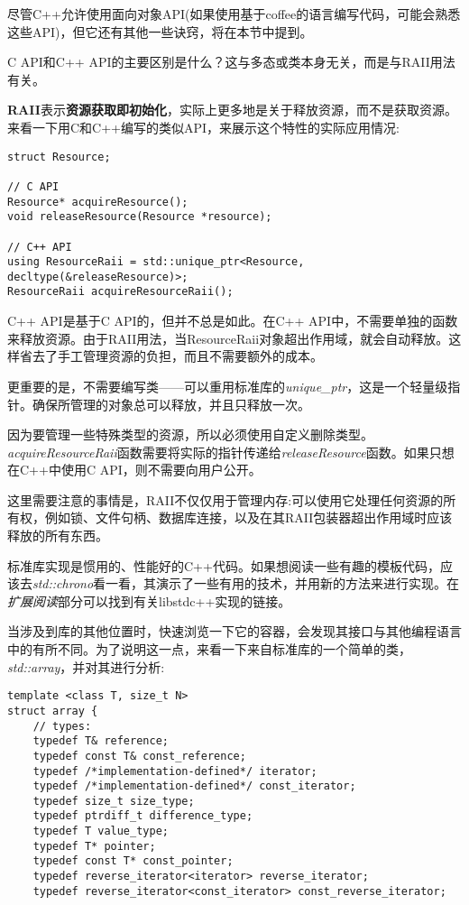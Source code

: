 
尽管C++允许使用面向对象API(如果使用基于coffee的语言编写代码，可能会熟悉这些API)，但它还有其他一些诀窍，将在本节中提到。


C API和C++ API的主要区别是什么？这与多态或类本身无关，而是与RAII用法有关。

\textbf{RAII}表示\textbf{资源获取即初始化}，实际上更多地是关于释放资源，而不是获取资源。来看一下用C和C++编写的类似API，来展示这个特性的实际应用情况:

\begin{lstlisting}[style=styleCXX]
struct Resource;

// C API
Resource* acquireResource();
void releaseResource(Resource *resource);

// C++ API
using ResourceRaii = std::unique_ptr<Resource, decltype(&releaseResource)>;
ResourceRaii acquireResourceRaii();
\end{lstlisting}

C++ API是基于C API的，但并不总是如此。在C++ API中，不需要单独的函数来释放资源。由于RAII用法，当ResourceRaii对象超出作用域，就会自动释放。这样省去了手工管理资源的负担，而且不需要额外的成本。

更重要的是，不需要编写类——可以重用标准库的\textit{unique\_ptr}，这是一个轻量级指针。确保所管理的对象总可以释放，并且只释放一次。

因为要管理一些特殊类型的资源，所以必须使用自定义删除类型。\textit{acquireResourceRaii}函数需要将实际的指针传递给\textit{releaseResource}函数。如果只想在C++中使用C API，则不需要向用户公开。

这里需要注意的事情是，RAII不仅仅用于管理内存:可以使用它处理任何资源的所有权，例如锁、文件句柄、数据库连接，以及在其RAII包装器超出作用域时应该释放的所有东西。


标准库实现是惯用的、性能好的C++代码。如果想阅读一些有趣的模板代码，应该去\textit{std::chrono}看一看，其演示了一些有用的技术，并用新的方法来进行实现。在\textit{扩展阅读}部分可以找到有关libstdc++实现的链接。

当涉及到库的其他位置时，快速浏览一下它的容器，会发现其接口与其他编程语言中的有所不同。为了说明这一点，来看一下来自标准库的一个简单的类，\textit{std::array}，并对其进行分析:

\begin{lstlisting}[style=styleCXX]
template <class T, size_t N>
struct array {
	// types:
	typedef T& reference;
	typedef const T& const_reference;
	typedef /*implementation-defined*/ iterator;
	typedef /*implementation-defined*/ const_iterator;
	typedef size_t size_type;
	typedef ptrdiff_t difference_type;
	typedef T value_type;
	typedef T* pointer;
	typedef const T* const_pointer;
	typedef reverse_iterator<iterator> reverse_iterator;
	typedef reverse_iterator<const_iterator> const_reverse_iterator;
\end{lstlisting}

